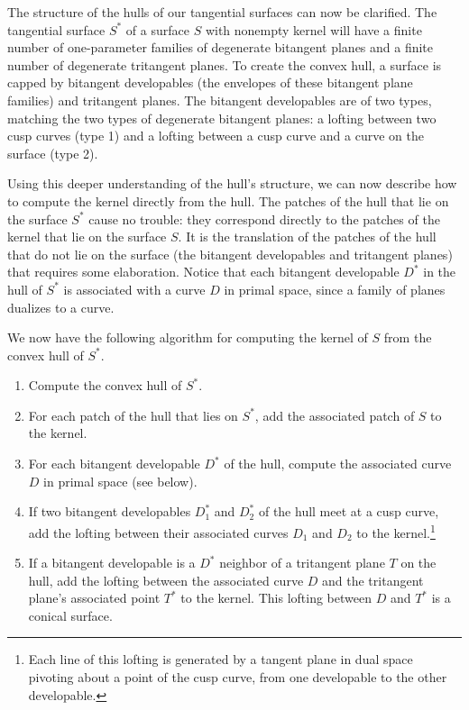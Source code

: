 \documentclass[twoside]{article}
\begin{document}
The structure of the hulls of our tangential surfaces can now be clarified.
The tangential surface $S^*$ of a surface $S$ with nonempty kernel 
will have a finite number of one-parameter families of degenerate bitangent planes
and a finite number of degenerate tritangent planes.
To create the convex hull, a surface is capped by bitangent developables
(the envelopes of these bitangent plane families) and tritangent planes.
The bitangent developables
are of two types, matching the two types of degenerate bitangent planes: 
a lofting between two cusp curves (type 1) and
a lofting between a cusp curve and a curve on the surface (type 2).

Using this deeper understanding of the hull's structure,
we can now describe how to compute the kernel directly from the hull.
The patches of the hull that lie on the surface $S^*$
cause no trouble: they correspond directly
to the patches of the kernel that lie on the surface $S$.
It is the translation of the patches of the hull that do not lie on the surface 
(the bitangent developables and tritangent planes)
that requires some elaboration.
Notice that each bitangent developable $D^*$ in the hull of $S^*$ 
is associated with a curve $D$ in primal space, since a family of planes dualizes to a curve.

We now have the following algorithm for computing the kernel of $S$ 
from the convex hull of $S^*$.

\begin{enumerate}
\item Compute the convex hull of $S^*$.
\item For each patch of the hull that lies on $S^*$, add the associated patch of $S$
	to the kernel.
\item For each bitangent developable $D^*$ of the hull, compute the associated curve $D$ in primal space
  (see below).
\item If two bitangent developables $D_1^*$ and $D_2^*$ of the hull meet at a cusp curve, 
  add the lofting between their associated curves $D_1$ and $D_2$ to the kernel.\footnote{
    Each line of this lofting is generated by a tangent plane in dual space pivoting 
    about a point of the cusp curve, from one developable to the other developable.}
\item If a bitangent developable is a $D^*$ neighbor of a tritangent plane $T$ on the hull,
add the lofting between the associated curve $D$ and the tritangent plane's
associated point $T^*$ to the kernel.  This lofting between $D$ and 
$T^*$ is a conical surface.
\end{enumerate}
\end{document}
